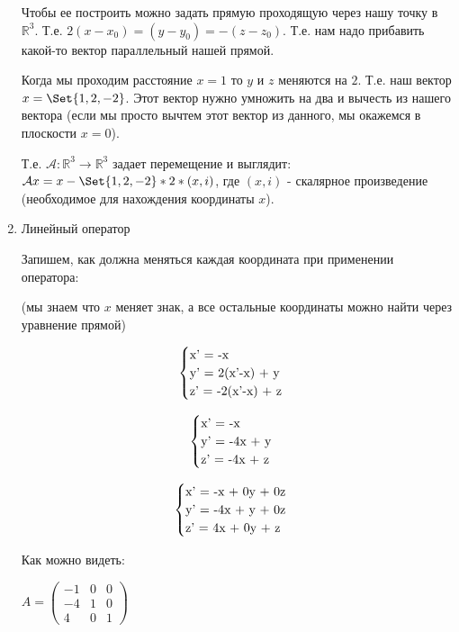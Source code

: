 \begin{enumerate}
    Чтобы ее построить можно задать прямую проходящую через нашу точку в $\mathbb{R}^3$. Т.е. $2(x-x_0)=(y-y_0)=-(z-z_0)$.
    Т.е. нам надо прибавить какой-то вектор параллельный нашей прямой.

    Когда мы проходим расстояние $x=1$ то $y$ и $z$ меняются на $2$.
    Т.е. наш вектор $x = \Set{1, 2, -2}$.
    Этот вектор нужно умножить на два и вычесть из нашего вектора
    (если мы просто вычтем этот вектор из данного, мы окажемся в плоскости $x=0$).

    Т.е. $\mathcal{A}: \mathbb{R}^3 \rightarrow \mathbb{R}^3$ задает перемещение и выглядит: $\mathcal{A}x = x - \Set{1,2,-2} * 2 * (x, i)$,
    где $(x,i)$ - скалярное произведение (необходимое для нахождения координаты $x$).

    \item Линейный оператор

    Запишем, как должна меняться каждая координата при применении оператора:

    (мы знаем что $x$ меняет знак, а все остальные координаты можно найти через уравнение прямой)

    \begin{equation*}
        \begin{cases}
            $x' = -x$\\
            $y' = 2(x'-x) + y$\\
            $z' = -2(x'-x) + z$
        \end{cases}
    \end{equation*}

    \begin{equation*}
        \begin{cases}
            $x' = -x$\\
            $y' = -4x + y$\\
            $z' = -4x + z$
        \end{cases}
    \end{equation*}

    \begin{equation*}
        \begin{cases}
            $x' = -x + 0y + 0z$\\
            $y' = -4x + y + 0z$\\
            $z' = 4x + 0y + z$
        \end{cases}
    \end{equation*}

    Как можно видеть:

    $ A =
    \begin{pmatrix}
        -1 & 0 & 0 \\
        -4 & 1 & 0 \\
        4  & 0 & 1
    \end{pmatrix}
    $


\end{enumerate}
